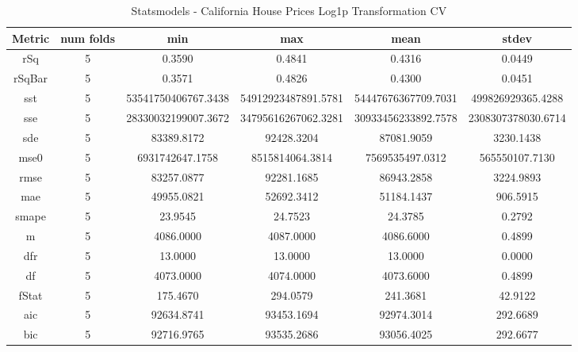 \documentclass{article}
\begin{document}
\begin{table}[H]
\centering
\caption{Statsmodels - California House Prices Log1p Transformation CV}
\label{tab:Statsmodels - House Prices Log1p Transformation CV}
\begin{tabular}{|c|c|c|c|c|c|}\hline
Metric & num folds & min & max & mean & stdev \\ \hline \hline
rSq & 5 & 0.3590 & 0.4841 & 0.4316 & 0.0449 \\ \hline
rSqBar & 5 & 0.3571 & 0.4826 & 0.4300 & 0.0451 \\ \hline
sst & 5 & 53541750406767.3438 & 54912923487891.5781 & 54447676367709.7031 & 499826929365.4288 \\ \hline
sse & 5 & 28330032199007.3672 & 34795616267062.3281 & 30933456233892.7578 & 2308307378030.6714 \\ \hline
sde & 5 & 83389.8172 & 92428.3204 & 87081.9059 & 3230.1438 \\ \hline
mse0 & 5 & 6931742647.1758 & 8515814064.3814 & 7569535497.0312 & 565550107.7130 \\ \hline
rmse & 5 & 83257.0877 & 92281.1685 & 86943.2858 & 3224.9893 \\ \hline
mae & 5 & 49955.0821 & 52692.3412 & 51184.1437 & 906.5915 \\ \hline
smape & 5 & 23.9545 & 24.7523 & 24.3785 & 0.2792 \\ \hline
m & 5 & 4086.0000 & 4087.0000 & 4086.6000 & 0.4899 \\ \hline
dfr & 5 & 13.0000 & 13.0000 & 13.0000 & 0.0000 \\ \hline
df & 5 & 4073.0000 & 4074.0000 & 4073.6000 & 0.4899 \\ \hline
fStat & 5 & 175.4670 & 294.0579 & 241.3681 & 42.9122 \\ \hline
aic & 5 & 92634.8741 & 93453.1694 & 92974.3014 & 292.6689 \\ \hline
bic & 5 & 92716.9765 & 93535.2686 & 93056.4025 & 292.6677 \\ \hline
\end{tabular}
\end{table}
\end{document}

